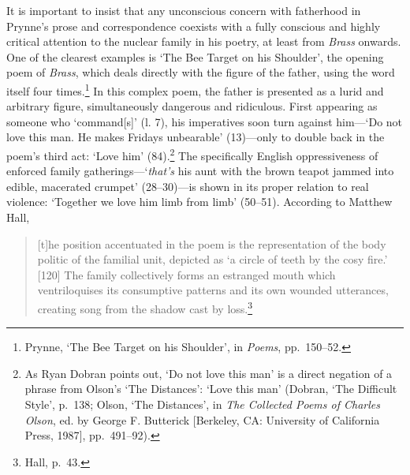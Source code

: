 \documentclass[]{article}
\begin{document}
It is important to insist that any unconscious concern with fatherhood
in Prynne's prose and correspondence coexists with a fully conscious and
highly critical attention to the nuclear family in his poetry, at least
from \emph{Brass} onwards. One of the clearest examples is `The Bee
Target on his Shoulder', the opening poem of \emph{Brass}, which deals
directly with the figure of the father, using the word itself four
times.\footnote{Prynne, `The Bee Target on his Shoulder', in
  \emph{Poems}, pp.~150--52.} In this complex poem, the father is
presented as a lurid and arbitrary figure, simultaneously dangerous and
ridiculous. First appearing as someone who `command{[}s{]}' (l. 7), his
imperatives soon turn against him---`Do not love this man. He makes
\textbar{} Fridays unbearable' (13)---only to double back in the poem's
third act: `Love him' (84).\footnote{As Ryan Dobran points out, `Do not
  love this man' is a direct negation of a phrase from Olson's `The
  Distances': `Love this man' (Dobran, `The Difficult Style', p.~138;
  Olson, `The Distances', in \emph{The Collected Poems of Charles
  Olson}, ed. by George F. Butterick {[}Berkeley, CA: University of
  California Press, 1987{]}, pp.~491--92).} The specifically English
oppressiveness of enforced family gatherings---`\emph{that's} his
\textbar{} aunt with the brown teapot jammed \textbar{} into edible,
macerated crumpet' (28--30)---is shown in its proper relation to real
violence: `Together we love him limb from \textbar{} limb' (50--51).
According to Matthew Hall,

\begin{quote}
{[}t{]}he position accentuated in the poem is the representation of the
body politic of the familial unit, depicted as `a circle of teeth by the
cosy fire.' {[}120{]} The family collectively forms an estranged mouth
which ventriloquises its consumptive patterns and its own wounded
utterances, creating song from the shadow cast by loss.\footnote{Hall,
  p.~43.}
\end{quote}
\end{document}
